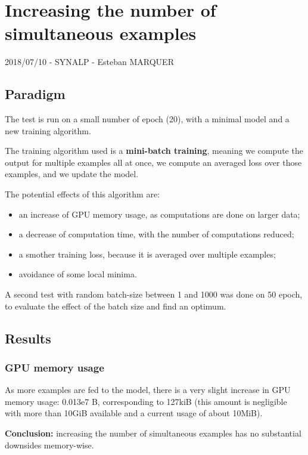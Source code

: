 \section*{Increasing the number of simultaneous
examples}

2018/07/10 - SYNALP - Esteban MARQUER

\subsection{Paradigm}

The test is run on a small number of epoch (20), with a minimal model
and a new training algorithm.

The training algorithm used is a \textbf{mini-batch training}, meaning
we compute the output for multiple examples all at once, we compute an
averaged loss over those examples, and we update the model.

The potential effects of this algorithm are:
\begin{itemize}
\item an increase of GPU memory usage, as computations are done on larger data;
\item a decrease of computation time, with the number of computations reduced;
\item a smother training loss, because it is averaged over multiple examples;
\item avoidance of some local minima.
\end{itemize}

A second test with random batch-size between 1 and 1000 was done on 50
epoch, to evaluate the effect of the batch size and find an optimum.

\subsection{Results}

\subsubsection{GPU memory usage}

As more examples are fed to the model, there is a very slight increase
in GPU memory usage: 0.013e7 B, corresponding to 127kiB (this amount is
negligible with more than 10GiB available and a current usage of about
10MiB).

\textbf{Conclusion:} increasing the number of simultaneous examples has
no substantial downsides memory-wise.

